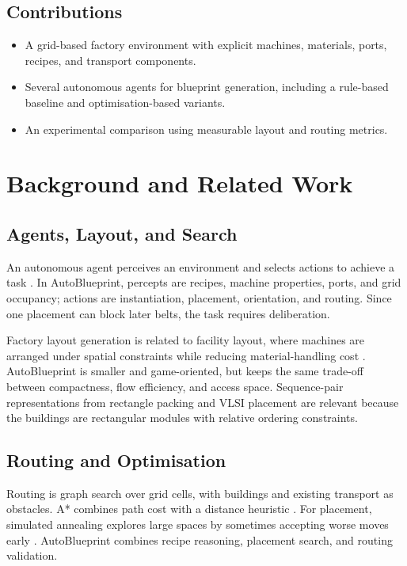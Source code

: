 \documentclass[11pt,a4paper]{article}
\begin{document}
\subsection{Contributions}
\begin{itemize}[leftmargin=*]
    \item A grid-based factory environment with explicit machines, materials, ports, recipes, and transport components.
    \item Several autonomous agents for blueprint generation, including a rule-based baseline and optimisation-based variants.
    \item An experimental comparison using measurable layout and routing metrics.
\end{itemize}

\section{Background and Related Work}
\label{sec:background}

\subsection{Agents, Layout, and Search}

An autonomous agent perceives an environment and selects actions to achieve a task \cite{russell2021ai}. In AutoBlueprint, percepts are recipes, machine properties, ports, and grid occupancy; actions are instantiation, placement, orientation, and routing. Since one placement can block later belts, the task requires deliberation.

Factory layout generation is related to facility layout, where machines are arranged under spatial constraints while reducing material-handling cost \cite{drira2007facility}. AutoBlueprint is smaller and game-oriented, but keeps the same trade-off between compactness, flow efficiency, and access space. Sequence-pair representations from rectangle packing and VLSI placement \cite{murata1996rectangle} are relevant because the buildings are rectangular modules with relative ordering constraints.

\subsection{Routing and Optimisation}

Routing is graph search over grid cells, with buildings and existing transport as obstacles. A* combines path cost with a distance heuristic \cite{hart1968astar}. For placement, simulated annealing explores large spaces by sometimes accepting worse moves early \cite{kirkpatrick1983annealing}. AutoBlueprint combines recipe reasoning, placement search, and routing validation.
\end{document}
